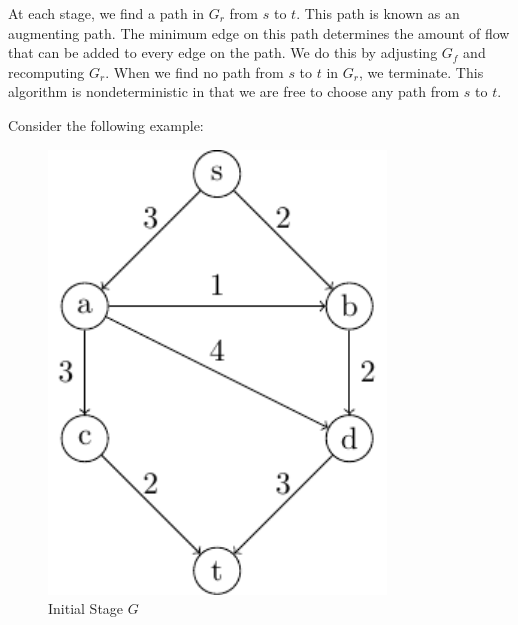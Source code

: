 At each stage, we find a path in \(G_r\) from \(s\) to \(t\). This path is known as an augmenting path. The minimum edge on this path determines the amount of flow that can be added to every edge on the path. We do this by adjusting \(G_f\) and recomputing \(G_r\). When we find no path from \(s\) to \(t\) in \(G_r\), we terminate. This algorithm is nondeterministic in that we are free to choose any path from \(s\) to \(t\).

Consider the following example: 

\begin{minipage}{0.2\textwidth}
\begin{figure}[H]
  \centering
  \includegraphics[width=0.8\textwidth]{Figure/maxflow_d1_1.pdf}
  \caption*{Initial Stage \(G\)}
\end{figure}
\end{minipage}
